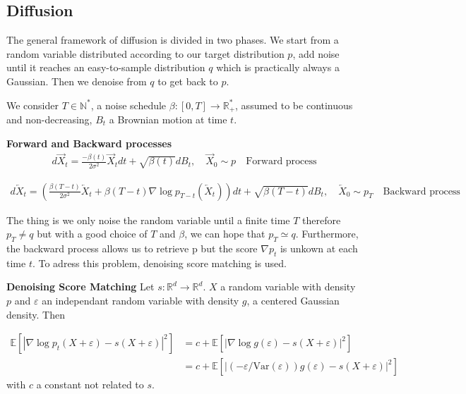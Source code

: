 \documentclass{article}
\begin{document}
\subsection{Diffusion}
The general framework of diffusion is divided in two phases. We start from a random variable distributed according to our target distribution \( p \), add noise until it reaches an easy-to-sample distribution \(q\) which is practically always a Gaussian. Then we denoise from \(q\) to get back to \(p\). 

\bigskip

We consider \(T\in\mathbb{N}^{*}\), a noise schedule \(\beta:[0,T]\rightarrow \mathbb{R}_{+}^{*}\), assumed to be continuous and non-decreasing, \(B_t\) a Brownian motion at time \(t\).

\textbf{Forward and Backward processes}
\begin{align}
    d\overrightarrow{X}_t = \frac{-\beta(t)}{2\sigma^2}\overrightarrow{X}_t dt + \sqrt{\beta(t)}dB_t, \quad \overrightarrow{X}_0\sim p 
    \quad \text{Forward process}
\end{align} 

\begin{align}
    d\overleftarrow{X}_t=\left(  \frac{\beta(T-t)}{2\sigma^2}\overleftarrow{X}_t+\beta(T-t)\nabla\log p_{T-t}\left(\overleftarrow{X}_t \right)  \right)dt + \sqrt{\beta(T-t)}dB_t, \quad \overleftarrow{X}_0\sim p_T \quad \text{Backward process}
\end{align}

The thing is we only noise the random variable until a finite time \(T\) therefore \(p_T\not= q\) but with a good choice of \(T\) and \(\beta\), we can hope that \(p_T\simeq q\). Furthermore, the backward process allows us to retrieve p but the score \(\nabla p_t\) is unkown at each time \(t\). To adress this problem, denoising score matching is used.  

\bigskip
\textbf{Denoising Score Matching} \newline
Let \(s:\mathbb{R}^d\rightarrow\mathbb{R}^d\). \(X\) a random variable with density \(p\) and \(\varepsilon\) an independant random variable with density \(g\), a centered Gaussian density. Then 

\begin{align}
    \mathbb{E}[|\nabla \log p_t (X+\varepsilon)-s(X+\varepsilon)|^2]&=c+\mathbb{E}[|\nabla \log g(\varepsilon)-s(X+\varepsilon)|^2]\\
    &=c+\mathbb{E}[|(-\varepsilon/\text{Var} (\varepsilon))g(\varepsilon)-s(X+\varepsilon)|^2]
\end{align}
with \(c\) a constant not related to \(s\).
\end{document}
